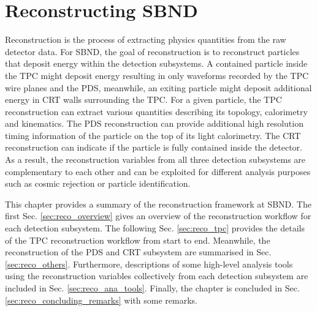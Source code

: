 
\chapter{Reconstructing SBND}
\label{ChapterReco}

\ifpdf
    \graphicspath{{Chapter6/Figs/Raster/}{Chapter6/Figs/PDF/}{Chapter6/Figs/}}
\else
    \graphicspath{{Chapter6/Figs/Vector/}{Chapter6/Figs/}}
\fi


Reconstruction is the process of extracting physics quantities from the raw detector data.
For SBND, the goal of reconstruction is to reconstruct particles that deposit energy within the detection subsystems.
A contained particle inside the TPC might deposit energy resulting in only waveforms recorded by the TPC wire planes and the PDS, meanwhile, an exiting particle might deposit additional energy in CRT walls surrounding the TPC.
For a given particle, the TPC reconstruction can extract various quantities describing its topology, calorimetry and kinematics.
The PDS reconstruction can provide additional high resolution timing information of the particle on the top of its light calorimetry.
The CRT reconstruction can indicate if the particle is fully contained inside the detector.
As a result, the reconstruction variables from all three detection subsystems are complementary to each other and can be exploited for different analysis purposes such as cosmic rejection or particle identification.

This chapter provides a summary of the reconstruction framework at SBND.
The first Sec. \ref{sec:reco_overview} gives an overview of the reconstruction workflow for each detection subsystem. 
The following Sec. \ref{sec:reco_tpc} provides the details of the TPC reconstruction workflow from start to end.
Meanwhile, the reconstruction of the PDS and CRT subsystem are summarised in Sec. \ref{sec:reco_others}.
Furthermore, descriptions of some high-level analysis tools using the reconstruction variables collectively from each detection subsystem are included in Sec. \ref{sec:reco_ana_tools}.                 
Finally, the chapter is concluded in Sec. \ref{sec:reco_concluding_remarks} with some remarks.


